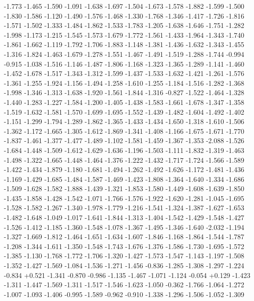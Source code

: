 \documentclass[9pt]{article}
\theoremstyle{plain}
\theoremstyle{definition}
\theoremstyle{remark}
\numberwithin{equation}{section}
\begin{document}
-1.773
-1.465
-1.590
-1.091
-1.638
-1.697
-1.504
-1.673
-1.578
-1.882
-1.599
-1.500
-1.830
-1.586
-1.120
-1.490
-1.576
-1.468
-1.330
-1.768
-1.346
-1.417
-1.726
-1.816
-1.571
-1.502
-1.333
-1.484
-1.862
-1.533
-1.783
-1.205
-1.638
-1.646
-1.751
-1.282
-1.998
-1.173
-1.215
-1.545
-1.573
-1.679
-1.772
-1.561
-1.433
-1.964
-1.343
-1.740
-1.861
-1.662
-1.119
-1.792
-1.706
-1.883
-1.148
-1.381
-1.436
-1.632
-1.343
-1.455
-1.316
-1.824
-1.463
-1.679
-1.278
-1.551
-1.467
-1.491
-1.519
-1.288
-1.744
-0.994
-0.915
-1.038
-1.516
-1.146
-1.487
-1.806
-1.168
-1.323
-1.365
-1.289
-1.141
-1.460
-1.452
-1.678
-1.517
-1.343
-1.312
-1.599
-1.437
-1.533
-1.632
-1.421
-1.261
-1.576
-1.361
-1.255
-1.924
-1.156
-1.494
-1.258
-1.610
-1.255
-1.184
-1.516
-1.282
-1.368
-1.998
-1.346
-1.313
-1.638
-1.920
-1.561
-1.844
-1.316
-0.827
-1.522
-1.464
-1.328
-1.440
-1.283
-1.227
-1.584
-1.200
-1.405
-1.438
-1.583
-1.661
-1.678
-1.347
-1.358
-1.519
-1.632
-1.581
-1.570
-1.699
-1.695
-1.552
-1.439
-1.482
-1.604
-1.492
-1.402
-1.151
-1.299
-1.794
-1.289
-1.862
-1.365
-1.433
-1.434
-1.650
-1.318
-1.610
-1.506
-1.362
-1.172
-1.665
-1.305
-1.612
-1.869
-1.341
-1.408
-1.166
-1.675
-1.671
-1.770
-1.837
-1.461
-1.377
-1.477
-1.489
-1.102
-1.581
-1.459
-1.367
-1.353
-2.088
-1.526
-1.684
-1.448
-1.509
-1.612
-1.629
-1.636
-1.196
-1.503
-1.111
-1.832
-1.319
-1.463
-1.498
-1.322
-1.665
-1.448
-1.464
-1.376
-1.222
-1.432
-1.717
-1.724
-1.566
-1.589
-1.422
-1.434
-1.879
-1.180
-1.681
-1.494
-1.262
-1.492
-1.626
-1.172
-1.481
-1.436
-1.169
-1.429
-1.685
-1.484
-1.587
-1.469
-1.423
-1.808
-1.364
-1.640
-1.334
-1.686
-1.509
-1.628
-1.582
-1.888
-1.439
-1.321
-1.853
-1.580
-1.449
-1.608
-1.639
-1.850
-1.435
-1.858
-1.428
-1.542
-1.071
-1.766
-1.576
-1.922
-1.620
-1.281
-1.045
-1.695
-1.528
-1.582
-1.267
-1.340
-1.978
-1.779
-1.216
-1.541
-1.324
-1.387
-1.627
-1.653
-1.482
-1.648
-1.049
-1.017
-1.641
-1.844
-1.313
-1.404
-1.542
-1.429
-1.548
-1.427
-1.526
-1.412
-1.185
-1.360
-1.548
-1.078
-1.367
-1.495
-1.346
-1.640
-2.032
-1.194
-1.327
-1.669
-1.812
-1.464
-1.651
-1.634
-1.607
-1.846
-1.168
-1.864
-1.544
-1.787
-1.208
-1.344
-1.611
-1.350
-1.548
-1.743
-1.676
-1.376
-1.586
-1.730
-1.695
-1.572
-1.385
-1.130
-1.768
-1.772
-1.706
-1.320
-1.427
-1.573
-1.547
-1.143
-1.197
-1.508
-1.352
-1.427
-1.569
-1.084
-1.536
-1.271
-1.456
-0.836
-1.285
-1.308
-1.297
-1.224
-0.834
+0.521
-1.341
-0.870
-0.986
-1.135
-1.467
-1.071
-1.124
-0.054
+0.129
-1.423
-1.311
-1.447
-1.569
-1.311
-1.517
-1.546
-1.623
-1.050
-0.362
-1.766
-1.064
-1.272
-1.007
-1.093
-1.406
-0.995
-1.589
-0.962
-0.910
-1.338
-1.296
-1.506
-1.052
-1.309
\end{document}

